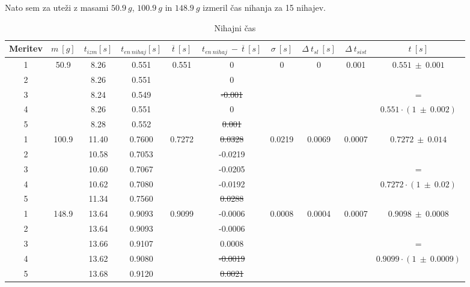 \documentclass{report}
\begin{document}
\noindent
Nato sem za uteži z masami $50.9  \ g$, $100.9 \ g$ in $148.9 \ g$ izmeril čas
nihanja za 15 nihajev.  


\begin{table}[H]
  \centering
  \caption{Nihajni čas}
  \begin{adjustwidth}{-3cm}{0cm}
  \begin{tabular}{cccccccccc}
  \toprule
  Meritev & $m \ [g]$ & $t_{izm} [s]$ & $t_{en \ nihaj} [s]$ &$ \overline{t} \ [s]$ & $t_{en \ nihaj} \ - \ \overline{t} \ [s]$ & $ \sigma \ [s] $ & $\Delta \ t_{sl} \ [s]$ & $ \Delta \ t_{sist} $ & $t \ [s]$\\
  \midrule
  1 & \multirow{5}{*}{50.9} & 8.26 & 0.551 & \multirow{5}{*}{0.551} & 0 & \multirow{5}{*}{0} & \multirow{5}{*}{0} & \multirow{5}{*}{0.001} &  \multirow{2}{*}{$0.551 \ \pm \ 0.001$}\\
  2 &  & 8.26 & 0.551 & & 0 & & & & \\
  3 &  & 8.24 & 0.549 & & \sout{-0.001} & & & & = \\
  4 &  & 8.26 & 0.551 & & 0 & & & & \multirow{2}{*}{$0.551 \cdot (1 \ \pm \ 0.002)$} \\
  5 &  & 8.28 & 0.552 & & \sout{0.001} & \\
  \midrule
  1 & \multirow{4}{*}{100.9} & 11.40 & 0.7600 & \multirow{5}{*}{0.7272} & \sout{0.0328} & \multirow{5}{*}{0.0219} & \multirow{5}{*}{0.0069} & \multirow{5}{*}{0.0007} & \multirow{2}{*}{$0.7272 \ \pm \ 0.014$}\\
  2 & & 10.58 & 0.7053 & & -0.0219 & & & & \\
  3 & & 10.60 & 0.7067 & & -0.0205 & & & & = \\
  4 & & 10.62 & 0.7080 & & -0.0192 & & & & \multirow{2}{*}{$0.7272 \cdot (1 \ \pm \ 0.02)$} \\
  5 & & 11.34 & 0.7560 & & \sout{0.0288}\\

  \midrule
  1 & \multirow{5}{*}{148.9} & 13.64 & 0.9093 & \multirow{5}{*}{0.9099} & -0.0006 & \multirow{5}{*}{0.0008} & \multirow{5}{*}{0.0004} & \multirow{5}{*}{0.0007} & \multirow{2}{*}{$0.9098 \ \pm \ 0.0008$}\\
  2 & & 13.64 & 0.9093 & & -0.0006 & & & & \\
  3 & & 13.66 & 0.9107 & & 0.0008 & & & & = \\
  4 & & 13.62 & 0.9080 & & \sout{-0.0019} & & & & \multirow{2}{*}{$0.9099 \cdot (1 \ \pm \ 0.0009)$}\\
  5 & & 13.68 & 0.9120 & & \sout{0.0021}\\
  \bottomrule
  \end{tabular}
  \end{adjustwidth}
\end{table}
\end{document}
